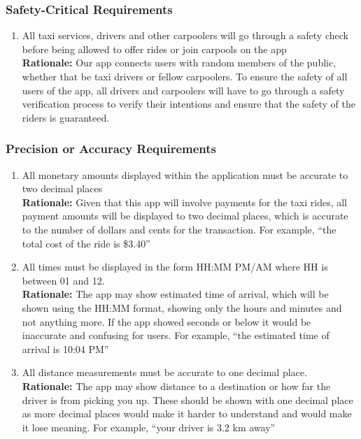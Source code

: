 \documentclass[]{article}
\begin{document}
\subsubsection{Safety-Critical Requirements}
\label{ssub:safety_critical_requirements}
\begin{enumerate}[{PR-SC}1. ]
	\item All taxi services, drivers and other carpoolers will go through a safety check before being allowed to offer rides or join carpools on the app \\
	{\bf Rationale:} Our app connects users with random members of the public, whether that be taxi drivers or fellow carpoolers. To ensure the safety of all users of the app, all drivers and carpoolers will have to go through a safety verification process to verify their intentions and ensure that the safety of the riders is guaranteed.
\end{enumerate}

\subsubsection{Precision or Accuracy Requirements}
\label{ssub:precision_or_accuracy_requirements}
\begin{enumerate}[{PR-PA}1. ]
	\item All monetary amounts displayed within the application must be accurate to two decimal places \\
	{\bf Rationale:} Given that this app will involve payments for the taxi rides, all payment amounts will be displayed to two decimal places, which is accurate to the number of dollars and cents for the transaction. For example, ``the total cost of the ride is \$3.40'' \\
	\item All times must be displayed in the form HH:MM PM/AM where HH is between 01 and 12. \\
	{\bf Rationale:} The app may show estimated time of arrival, which will be shown using the HH:MM format, showing only the hours and minutes and not anything more. If the app showed seconds or below it would be inaccurate and confusing for users. For example, ``the estimated time of arrival is 10:04 PM'' \\
	\item All distance measurements must be accurate to one decimal place. \\
	{\bf Rationale:} The app may show distance to a destination or how far the driver is from picking you up. These should be shown with one decimal place as more decimal places would make it harder to understand and would make it lose meaning. For example, ``your driver is 3.2 km away''
\end{enumerate}
\end{document}
